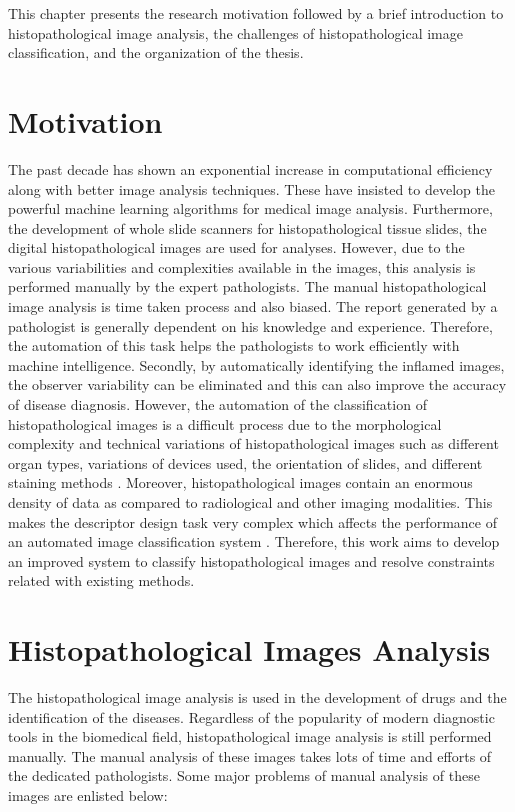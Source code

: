 This chapter presents the research motivation followed by a brief introduction to histopathological image analysis, the challenges of histopathological image classification, and the organization of the thesis.

\section{Motivation}\label{ch1:sec:Motivation}
The past decade has shown an exponential increase in computational efficiency along with better image analysis techniques. These have insisted to develop the powerful machine learning algorithms for medical image analysis. Furthermore, the development of whole slide scanners for histopathological tissue slides, the digital histopathological images are used for analyses. However, due to the various variabilities and complexities available in the images, this analysis is performed manually by the expert pathologists. The manual histopathological image analysis is time taken process and  also biased. The report generated by a pathologist is generally dependent on his knowledge and experience. Therefore, the automation of this task helps the pathologists to work efficiently with machine intelligence. Secondly, by automatically identifying the inflamed images, the observer variability can be eliminated and this can also improve the accuracy of disease diagnosis. However, the automation of the classification of histopathological images is a difficult process due to the morphological complexity and technical variations of histopathological images such as different organ types, variations of devices used, the orientation of slides, and different staining methods \cite{basavanhally2009}. 
Moreover, histopathological images contain an enormous density of data as compared to radiological and other imaging modalities. This makes the descriptor design task very complex which affects the performance of an automated image classification system \cite{gurcan2009}.  Therefore, this work aims to develop an improved system to classify histopathological images and  resolve constraints related with existing methods.

\section{Histopathological Images Analysis}


The histopathological image analysis is used in the development of drugs and the identification of the diseases. Regardless of the popularity of modern diagnostic tools in the biomedical field, histopathological image analysis is still performed manually. The manual analysis of these images takes lots of time and efforts of the dedicated pathologists. Some major problems of  manual analysis of these images are enlisted below:


